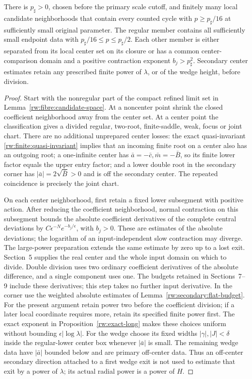 \begin{lemma}
\label{rw:fibre:candidate-cover}
There is $p_\sharp>0$, chosen before the primary scale cutoff,
and finitely many local candidate neighborhoods that contain every
counted cycle with $p\ge p_\sharp/16$ at sufficiently small
original parameter. The regular member contains all sufficiently
small endpoint data with
$p_\sharp/16\le p\le p_\sharp/2$.
Each other member is either separated from its local center set
on its closure or has a common center-comparison domain and a
positive contraction exponent $b_j>p_\sharp^2$.
Secondary center estimates retain any prescribed finite power
of $\lambda$, or of the wedge height, before division.
\end{lemma}
\begin{proof}
Start with the nonregular part of the compact refined limit set
in Lemma~\ref{rw:fibre:candidate-space}. At a noncenter point
shrink the closed coefficient neighborhood away from the center
set. At a center point the classification gives a divided regular,
two-root, finite-saddle, weak, focus or joint chart.
There are no additional unprepared center losses: the exact
quasi-invariant \eqref{rw:finite:quasi-invariant} implies that an
incoming finite root on a center also has an outgoing root; a
one-infinite center has
$\bar a=-\bar c,\bar m=-\bar B$, so its finite lower factor
equals the upper entry factor; and a lower double root in the
secondary corner has $|\bar a|=2\sqrt{\bar B}>0$ and is off
the secondary center. The repeated coincidence is precisely the
joint chart.

On each center neighborhood, first retain a fixed lower subsegment
with positive action. After reducing the coefficient neighborhood,
normal contraction on this subsegment bounds the absolute coefficient
derivatives of the complete central deviations by
$C\epsilon^{-N}e^{-b_j/\epsilon}$, with $b_j>0$.
These are estimates of the absolute deviations; the logarithm of an
input-independent slow contraction may diverge. The large-power
preparation extends the same estimate by zero up to a lost exit.
Section~5 supplies the real center and the whole input domain on which
to divide. Double division uses two ordinary coefficient derivatives
of the absolute difference, and a single component uses one. The
budgets retained in Sections~7--9 include these derivatives; this step
takes no further input derivative.
In the corner use the weighted absolute estimates of
Lemma~\ref{rw:secondary:flat-budget}. For the present argument
retain power two before the coefficient division; if a later local
coordinate requires more, retain its specified finite power first.
The exact exponent in Proposition~\ref{rw:exact-long} makes
these choices uniform without bounding $\epsilon|\log\lambda|$.
For the wedge choose its fixed widths $|\gamma|,|J|<\delta$
inside the regular-lower center box whenever $|\bar a|$ is
small. The remaining wedge data have $|\bar a|$ bounded
below and are primary off-center data. Thus an off-center
secondary direction attached to a first wedge exit is not
used to estimate that exit by a power of $\lambda$; its
actual radial power is a power of $H$.


\end{proof}
